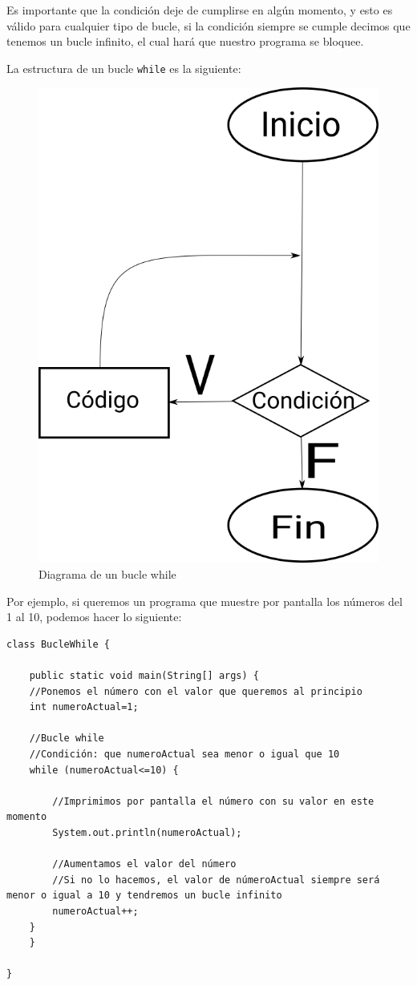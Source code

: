 \documentclass[11pt]{article}
\begin{document}
Es importante que la condición deje de cumplirse en algún momento, y esto es válido para cualquier tipo de bucle, si la condición siempre se cumple decimos que tenemos un bucle infinito, el cual hará que nuestro programa se bloquee.

La estructura de un bucle \texttt{while} es la siguiente:
\begin{figure}[htbp]
\centering
\includegraphics[width=.9\linewidth]{while.png}
\caption{Diagrama de un bucle while}
\end{figure}

Por ejemplo, si queremos un programa que muestre por pantalla los números del 1 al 10, podemos hacer lo siguiente:

\begin{verbatim}
class BucleWhile {

    public static void main(String[] args) {
	//Ponemos el número con el valor que queremos al principio
	int numeroActual=1;

	//Bucle while
	//Condición: que numeroActual sea menor o igual que 10
	while (numeroActual<=10) {

	    //Imprimimos por pantalla el número con su valor en este momento
	    System.out.println(numeroActual);

	    //Aumentamos el valor del número
	    //Si no lo hacemos, el valor de númeroActual siempre será menor o igual a 10 y tendremos un bucle infinito
	    numeroActual++;
	}
    }

}
\end{verbatim}
\end{document}
